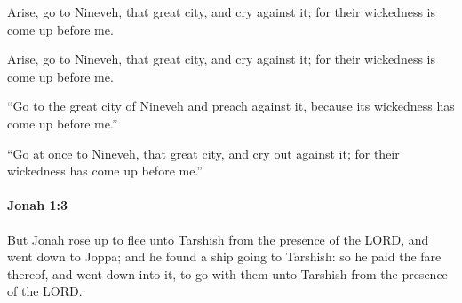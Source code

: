 			Arise, go to Nineveh, that great city, and cry against it; for their wickedness is come up before me.

			\begin{versebox}
					\item[BHS] 
					\item[LXX] 
					\item[ASV] Arise, go to Nineveh, that great city, and cry against it; for their wickedness is come up before me.
					\item[NIV] “Go to the great city of Nineveh and preach against it, because its wickedness has come up before me.”
					\item[NRSV] “Go at once to Nineveh, that great city, and cry out against it; for their wickedness has come up before me.”
			\end{versebox}

		\paragraph{Jonah 1:3} %
			\label{JONAH-1-3}

			But Jonah rose up to flee unto Tarshish from the presence of the LORD, and went down to Joppa; and he found a ship going to Tarshish: so he paid the fare thereof, and went down into it, to go with them unto Tarshish from the presence of the LORD.

